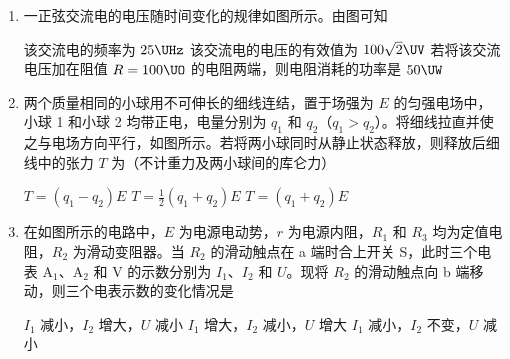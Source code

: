 \documentclass[\gkver]{gaokaozhenti}
\begin{document}
\begin{enumerate}
\item
一正弦交流电的电压随时间变化的规律如图所示。由图可知


{该交流电的频率为 $25\UHz$}
{该交流电的电压的有效值为 $100\sqrt{2}\UV$}
{若将该交流电压加在阻值 $R=100\UO$ 的电阻两端，则电阻消耗的功率是 $50\UW$}


\item
两个质量相同的小球用不可伸长的细线连结，置于场强为 $E$ 的匀强电场中，小球 1 和小球 2 均带正电，电量分别为 $q_{1}$ 和 $q_{2}$（$q_{1}>q_{2}$）。将细线拉直并使之与电场方向平行，如图所示。若将两小球同时从静止状态释放，则释放后细线中的张力 $T$ 为（不计重力及两小球间的库仑力）


{$T=(q_{1}-q_{2})E$}
{$T=\frac{1}{2}(q_{1}+q_{2})E$}
{$T=(q_{1}+q_{2})E$}


\item
在如图所示的电路中，$E$ 为电源电动势，$r$ 为电源内阻，$R_{1}$ 和 $R_{3}$ 均为定值电阻，$R_{2}$ 为滑动变阻器。当 $R_{2}$ 的滑动触点在 a 端时合上开关 S，此时三个电表 A$_{1}$、A$_{2}$ 和 V 的示数分别为 $I_{1}$、$I_{2}$ 和 $U$。现将 $R_{2}$ 的滑动触点向 b 端移动，则三个电表示数的变化情况是


{$I_{1}$ 减小，$I_{2}$ 增大，$U$ 减小}
{$I_{1}$ 增大，$I_{2}$ 减小，$U$ 增大}
{$I_{1}$ 减小，$I_{2}$ 不变，$U$ 减小}


\end{enumerate}
\end{document}
